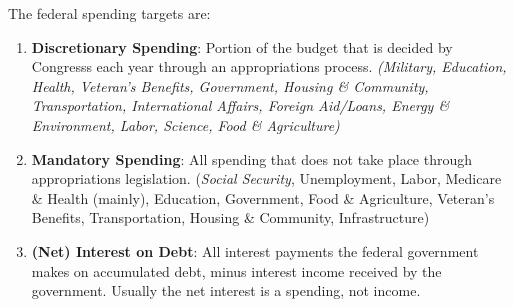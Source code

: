 \documentclass{article}
\begin{document}
    \begin{definition}
      \label{def:federal-spending-targets}
      The federal spending targets are: 
      \begin{enumerate}
        \item \textbf{Discretionary Spending}: Portion of the budget that is decided by Congresss each year through an appropriations process. \textit{(Military, Education, Health, Veteran's Benefits, Government, Housing \& Community, Transportation, International Affairs, Foreign Aid/Loans, Energy \& Environment, Labor, Science, Food \& Agriculture)}
        \item \textbf{Mandatory Spending}: All spending that does not take place through appropriations legislation. (\textit{Social Security}, Unemployment, Labor, Medicare \& Health (mainly), Education, Government, Food \& Agriculture, Veteran's Benefits, Transportation, Housing \& Community, Infrastructure)
        \item \textbf{(Net) Interest on Debt}: All interest payments the federal government makes on accumulated debt, minus interest income received by the government. Usually the net interest is a spending, not income.
      \end{enumerate}
    \end{definition}
\end{document}
